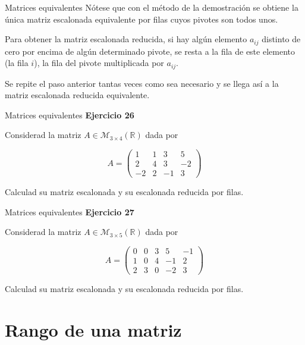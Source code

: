 \documentclass[
  ignorenonframetext,
]{beamer}
\begin{document}
\begin{frame}{Matrices equivalentes}
\protect\hypertarget{matrices-equivalentes-2}{}
Nótese que con el método de la demostración se obtiene la única matriz
escalonada equivalente por filas cuyos pivotes son todos unos.

Para obtener la matriz escalonada reducida, si hay algún elemento
\(a_{ij}\) distinto de cero por encima de algún determinado pivote, se
resta a la fila de este elemento (la fila \(i\)), la fila del pivote
multiplicada por \(a_{ij}\).

Se repite el paso anterior tantas veces como sea necesario y se llega
así a la matriz escalonada reducida equivalente.
\end{frame}

\begin{frame}{Matrices equivalentes}
\protect\hypertarget{matrices-equivalentes-3}{}
\textbf{Ejercicio 26}

Considerad la matriz \(A\in\mathcal{M}_{3\times 4}(\mathbb{R})\) dada
por

\[A=\begin{pmatrix}1&1&3&5\\2&4&3&-2\\-2&2&-1&3\end{pmatrix}\]

Calculad su matriz escalonada y su escalonada reducida por filas.
\end{frame}

\begin{frame}{Matrices equivalentes}
\protect\hypertarget{matrices-equivalentes-4}{}
\textbf{Ejercicio 27}

Considerad la matriz \(A\in\mathcal{M}_{3\times 5}(\mathbb{R})\) dada
por

\[A=\begin{pmatrix}0&0&3&5&-1\\1&0&4&-1&2\\2&3&0&-2&3\end{pmatrix}\]

Calculad su matriz escalonada y su escalonada reducida por filas.
\end{frame}

\hypertarget{rango-de-una-matriz}{%
\section{Rango de una matriz}\label{rango-de-una-matriz}}
\end{document}
